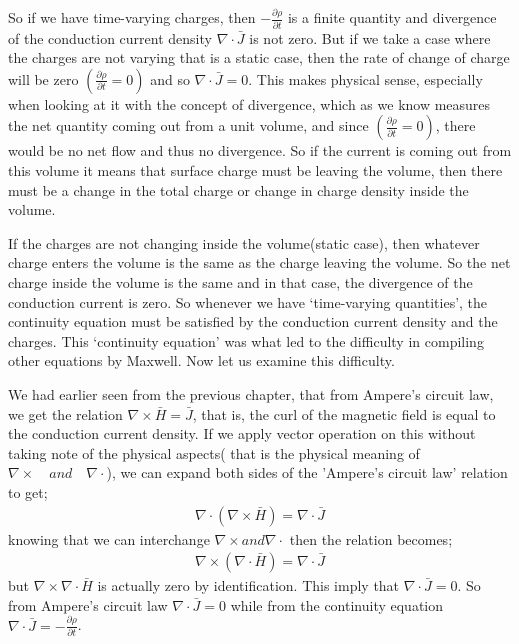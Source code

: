 So if we have time-varying charges, then $-\frac{\partial\rho}{\partial t}$ is a finite quantity and divergence of the conduction current density $\nabla\cdot\bar{J}$ is not zero. But if we take a case where the charges are not varying that is a static case, then the rate of change of charge will be zero $(\frac{\partial\rho}{\partial t}=0)$ and so $\nabla\cdot\bar{J}=0$. This makes physical sense, especially when looking at it with the concept of divergence, which as we know measures the net quantity coming out from a unit volume, and since $(\frac{\partial\rho}{\partial t}=0)$, there would be no net flow and thus no divergence. So if the current is coming out from this volume it means that surface charge must be leaving the volume, then there must be a change in the total charge or change in charge density inside the volume.

If the charges are not changing inside the volume(static case), then whatever charge enters the volume is the same as the charge leaving the volume. So the net charge inside the volume is the same and in that case, the divergence of the conduction current is zero. So whenever we have `time-varying quantities', the continuity equation must be satisfied by the conduction current density and the charges. This `continuity equation' was what led to the difficulty in compiling other equations by Maxwell. Now let us examine this difficulty.

We had earlier seen from the previous chapter, that from Ampere's circuit law, we get the relation $\nabla\times\bar{H}=\bar{J}$, that is, the curl of the magnetic field is equal to the conduction current density. If we apply vector operation on this without taking note of the physical aspects( that is the physical meaning of $\nabla\times\quad and\quad \nabla\cdot$), we can expand both sides of the 'Ampere's circuit law' relation to get;
\begin{align}
	\nabla\cdot(\nabla\times\bar{H})=\nabla\cdot\bar{J}
\end{align}
knowing that we can interchange $\nabla\times and \nabla\cdot$ then the relation becomes;
\begin{align}
	\nabla\times(\nabla\cdot\bar{H})=\nabla\cdot\bar{J}
\end{align}
but $\nabla\times\nabla\cdot\bar{H}$ is actually zero by identification. This imply that $\nabla\cdot\bar{J}=0$. So from Ampere's circuit law $\nabla\cdot\bar{J}=0$ while from the continuity equation $\nabla\cdot\bar{J}=-\frac{\partial\rho}{\partial t}$.

